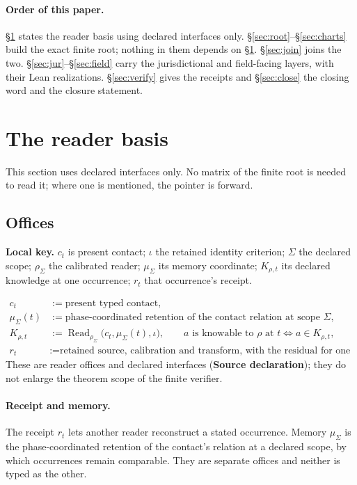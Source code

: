 \documentclass[11pt,a4paper]{article}
\DeclareMathOperator{\Read}{Read}\DeclareMathOperator{\Recognize}{Recognize}
\newcommand{\st}[1]{\textsf{\small\textbf{#1}}}
\newcommand{\Ssrc}{\st{Source declaration}}\newcommand{\Sint}{\st{Interface}}
\newcommand{\lkey}[1]{\par\noindent\textbf{Local key.} #1\par\smallskip}
\theoremstyle{plain}
\theoremstyle{definition}
\theoremstyle{remark}
\begin{document}
\paragraph{Order of this paper.} \S\ref{sec:reader} states the reader basis using declared interfaces only. \S\ref{sec:root}--\S\ref{sec:charts} build the exact finite root; nothing in them depends on \S\ref{sec:reader}. \S\ref{sec:join} joins the two. \S\ref{sec:jur}--\S\ref{sec:field} carry the jurisdictional and field-facing layers, with their Lean realizations. \S\ref{sec:verify} gives the receipts and \S\ref{sec:close} the closing word and the closure statement.

\section{The reader basis}\label{sec:reader}
This section uses declared interfaces only. No matrix of the finite root is needed to read it; where one is mentioned, the pointer is forward.

\subsection{Offices}
\lkey{$c_t$ is present contact; $\iota$ the retained identity criterion; $\Sigma$ the declared scope; $\rho_\Sigma$ the calibrated reader; $\mu_\Sigma$ its memory coordinate; $K_{\rho,t}$ its declared knowledge at one occurrence; $r_t$ that occurrence's receipt.}
\begin{align*}
c_t &:= \text{present typed contact},\\
\mu_\Sigma(t) &:= \text{phase-coordinated retention of the contact relation at scope }\Sigma,\\
K_{\rho,t} &:= \Read_{\rho_\Sigma}\bigl(c_t,\mu_\Sigma(t),\iota\bigr),\qquad a\text{ is knowable to }\rho\text{ at }t\iff a\in K_{\rho,t},\\
r_t &:= \text{retained source, calibration and transform, with the residual for one occurrence.}
\end{align*}
These are reader offices and declared interfaces (\Ssrc); they do not enlarge the theorem scope of the finite verifier.

\paragraph{Receipt and memory.} The receipt $r_t$ lets another reader reconstruct a stated occurrence. Memory $\mu_\Sigma$ is the phase-coordinated retention of the contact's relation at a declared scope, by which occurrences remain comparable. They are separate offices and neither is typed as the other.
\end{document}
